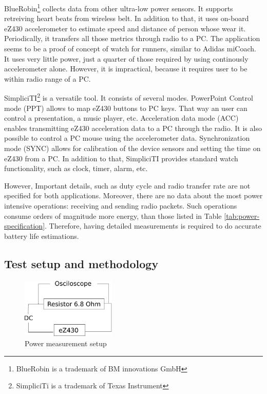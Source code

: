 BlueRobin\footnote{BlueRobin is a trademark of BM innovations GmbH} collects data from other ultra-low power sensors.
It supports retreiving heart beats from wireless belt.
In addition to that, it uses on-board eZ430 accelerometer to estimate speed and distance of person whose wear it.
Periodically, it transfers all those metrics through radio to a PC.
The application seems to be a proof of concept of watch for runners, similar to Adidas miCoach. 
It uses very little power, just a quarter of those required by using continously accelerometer alone.
However, it is impractical, because it requires user to be within radio range of a PC.

SimpliciTI\footnote{SimpliciTi is a trademark of Texas Instrument} is a versatile tool.
It consists of several modes.
PowerPoint Control mode (PPT) allows to map eZ430 buttons to PC keys.
That way an user can control a presentation, a music player, etc.
Acceleration data mode (ACC) enables transmitting eZ430 acceleration data to a PC through the radio.
It is also possible to control a PC mouse using the accelerometer data.
Synchronization mode (SYNC) allows for calibration of the device sensors and setting the time on eZ430 from a PC.
In addition to that, SimpliciTI provides standard watch functionality, such as clock, timer, alarm, etc. 

However, Important details, such as duty cycle and radio transfer rate are not specified for both applications.
Moreover, there are no data about the most power intensive operations: receiving and sending radio packets.
Such operations consume orders of magnitude more energy, than those listed in Table \ref{tab:power-specification}.
Therefore, having detailed measurements is required to do accurate battery life estimations.

\subsection{Test setup and methodology}

\begin{figure}[h]
  \centering
  \includegraphics[width=0.4\textwidth]{diagrams/power.eps}
  \caption{Power measurement setup}
  \label{fig:power}
\end{figure}

